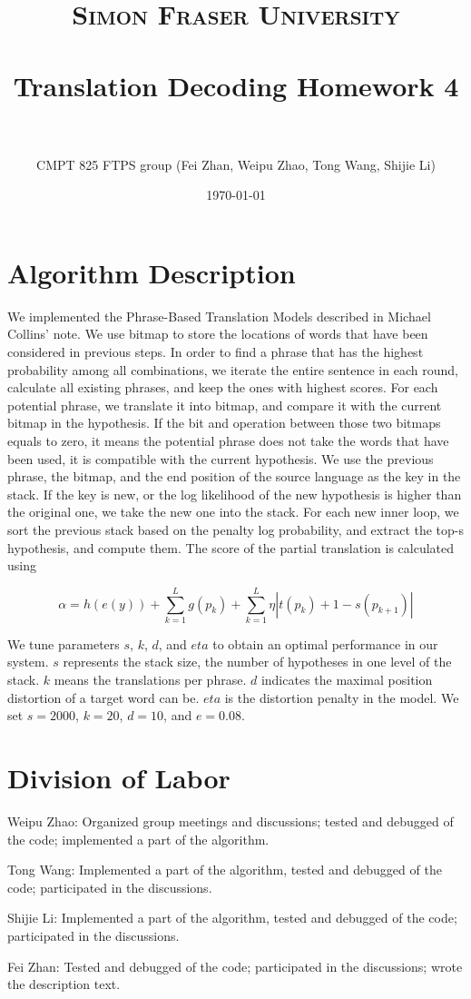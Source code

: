 \documentclass[paper=a4, fontsize=11pt]{scrartcl}
\title{
		\usefont{OT1}{bch}{b}{n}
		\normalfont \normalsize \textsc{Simon Fraser University} \\ [25pt]
		\horrule{0.5pt} \\[0.4cm]
		\huge Translation Decoding Homework 4 \\
		\horrule{2pt} \\[0.5cm]
}
\author{
		\normalfont 								\normalsize
        CMPT 825 FTPS group (Fei Zhan, Weipu Zhao, Tong Wang, Shijie Li) \\[-3pt]		\normalsize
}
\date{\today}
\numberwithin{equation}{section}		%
\numberwithin{figure}{section}			%
\numberwithin{table}{section}				%
\begin{document}
\maketitle

\section{Algorithm Description}

We implemented the Phrase-Based Translation Models described in Michael Collins' note.
We use bitmap to store the locations of words that have been considered in previous steps.
In order to find a phrase that has the highest probability among all combinations, we iterate the entire sentence in each round, calculate all existing phrases, and keep the ones with highest scores.
For each potential phrase, we translate it into bitmap, and compare it with the current bitmap in the hypothesis.
If the bit and operation between those two bitmaps equals to zero, it means the potential phrase does not take the words that have been used, it is compatible with the current hypothesis.
We use the previous phrase, the bitmap, and the end position of the source language as the key in the stack.
If the key is new, or the log likelihood of the new hypothesis is higher than the original one, we take the new one into the stack.
For each new inner loop, we sort the previous stack based on the penalty log probability, and extract the top-s hypothesis, and compute them.
The score of the partial translation is calculated using

\begin{equation}
\alpha = h(e(y)) + \sum_{k=1}^{L} g(p_{k}) + \sum_{k=1}^{L} \eta |t(p_k) + 1 - s(p_{k+1})|
\end{equation}

We tune parameters $s$, $k$, $d$, and $eta$ to obtain an optimal performance in our system.
$s$ represents the stack size, the number of hypotheses in one level of the stack.
$k$ means the translations per phrase.
$d$ indicates the maximal position distortion of a target word can be.
$eta$ is the distortion penalty in the model.
We set $s = 2000$, $k = 20$, $d = 10$, and $e = 0.08$.

\section{Division of Labor}

Weipu Zhao: Organized group meetings and discussions; tested and debugged of the code; implemented a part of the algorithm.

Tong Wang: Implemented a part of the algorithm, tested and debugged of the code; participated in the discussions.

Shijie Li: Implemented a part of the algorithm, tested and debugged of the code; participated in the discussions.

Fei Zhan: Tested and debugged of the code; participated in the discussions; wrote the description text.

\end{document}
